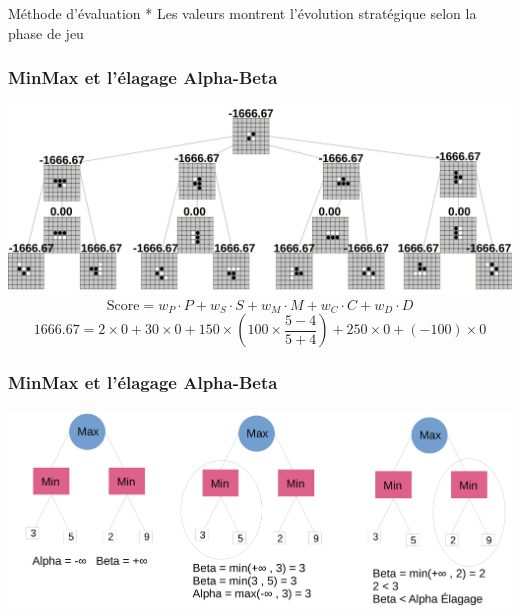 \begin{frame}[t]{Méthode d'évaluation}
    \vspace{0.1cm}
    \centering
    \tiny
    * Les valeurs montrent l'évolution stratégique selon la phase de jeu
\end{frame}



\begin{frame}
    \frametitle{MinMax et l'élagage Alpha-Beta}
    \centering
    \includegraphics[width=1\textwidth]{img/minmax_eval.jpg}
    \[
    \mathrm{Score} = w_P \cdot P + w_S \cdot S + w_M \cdot M + w_C \cdot C + w_D \cdot D
    \]
    \begin{equation*}
    1666.67 = 2 \times 0 + 30 \times 0 + 150 \times \left(100 \times \frac{5-4}{5+4}\right) + 250 \times 0 + (-100) \times 0
    \end{equation*}
\end{frame}

\begin{frame}
    \frametitle{MinMax et l'élagage Alpha-Beta}
    \centering
    \includegraphics[width=1\textwidth]{img/alphabeta.jpg}
\end{frame}
